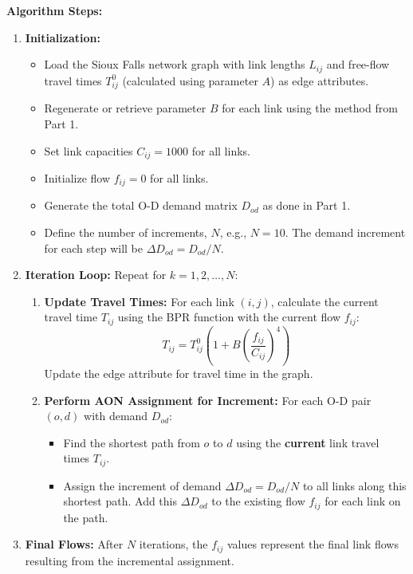 \documentclass{rapportCS} %
\begin{document}
\textbf{Algorithm Steps:}
\begin{enumerate}
    \item \textbf{Initialization:}
    \begin{itemize}
        \item Load the Sioux Falls network graph with link lengths \( L_{ij} \) and free-flow travel times \( T_{ij}^0 \) (calculated using parameter \( A \)) as edge attributes.
        \item Regenerate or retrieve parameter \( B \) for each link using the method from Part 1.
        \item Set link capacities \( C_{ij} = 1000 \) for all links.
        \item Initialize flow \( f_{ij} = 0 \) for all links.
        \item Generate the total O-D demand matrix \( D_{od} \) as done in Part 1.
        \item Define the number of increments, \( N \), e.g., \( N=10 \). The demand increment for each step will be \( \Delta D_{od} = D_{od} / N \).
    \end{itemize}

    \item \textbf{Iteration Loop:} Repeat for \( k = 1, 2, \ldots, N \):
    \begin{enumerate}
        \item \textbf{Update Travel Times:} For each link \( (i, j) \), calculate the current travel time \( T_{ij} \) using the BPR function with the current flow \( f_{ij} \):
        $$ T_{ij} = T_{ij}^0 \left( 1 + B \left( \frac{f_{ij}}{C_{ij}} \right)^4 \right) $$
        Update the edge attribute for travel time in the graph.

        \item \textbf{Perform AON Assignment for Increment:} For each O-D pair \( (o, d) \) with demand \( D_{od} \):
        \begin{itemize}
            \item Find the shortest path from \( o \) to \( d \) using the \textbf{current} link travel times \( T_{ij} \).
            \item Assign the increment of demand \( \Delta D_{od} = D_{od} / N \) to all links along this shortest path. Add this \( \Delta D_{od} \) to the existing flow \( f_{ij} \) for each link on the path.
        \end{itemize}
    \end{enumerate}

    \item \textbf{Final Flows:} After \( N \) iterations, the \( f_{ij} \) values represent the final link flows resulting from the incremental assignment.
\end{enumerate}
\newpage
\end{document}
